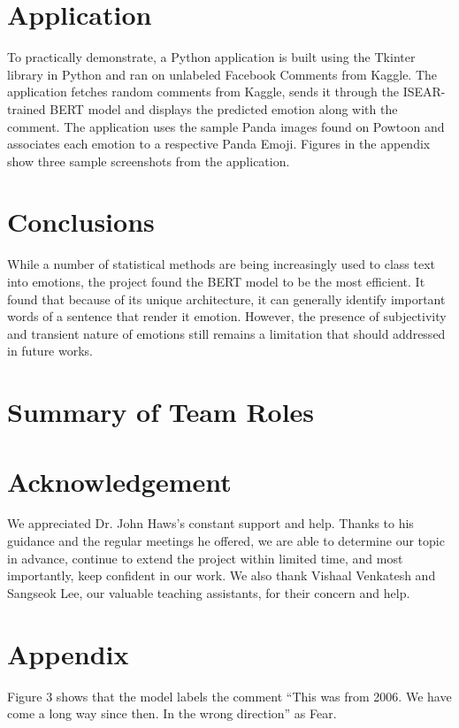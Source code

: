 \documentclass[11pt]{article}
\begin{document}
\section{Application}
\label{sec:app} 

To practically demonstrate, a Python application is built using the Tkinter library in Python and ran on unlabeled Facebook Comments from Kaggle. The application fetches random comments from Kaggle, sends it through the ISEAR-trained BERT model and displays the predicted emotion along with the comment. The application uses the sample Panda images found on Powtoon and associates each emotion to a respective Panda Emoji. Figures in the appendix show three sample screenshots from the application. 
 

\section{Conclusions}
\label{sec:con}

While a number of statistical methods are being increasingly used to class text into emotions, the project found the BERT model to be the most efficient. It found that because of its unique architecture, it can generally identify important words of a sentence that render it emotion. However, the presence of subjectivity and transient nature of emotions still remains a limitation that should addressed in future works.

\section{Summary of Team Roles}

\section{Acknowledgement}
We appreciated Dr. John Haws's constant support and help. Thanks to his guidance and the regular meetings he offered, we are able to determine our topic in advance, continue to extend the project within limited time, and most importantly, keep confident in our work. We also thank Vishaal Venkatesh and Sangseok Lee, our valuable teaching assistants, for their concern and help.






\newpage
\onecolumn
\section*{Appendix}
Figure 3 shows that the model labels the comment “This was from 2006. We have come a long way since then. In the wrong direction” as Fear. 
\end{document}

